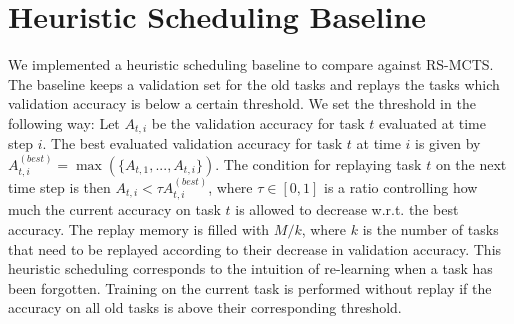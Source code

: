 
\section{Heuristic Scheduling Baseline}\label{paperC:app:heuristic_scheduling_baseline}

We implemented a heuristic scheduling baseline to compare against RS-MCTS. The baseline keeps a validation set for the old tasks and replays the tasks which validation accuracy is below a certain threshold. We set the threshold in the following way: Let $A_{t, i}$ be the validation accuracy for task $t$ evaluated at time step $i$. The best evaluated validation accuracy for task $t$ at time $i$ is given by $A_{t, i}^{(best)} = \max(\{A_{t, 1}, ..., A_{t, i} \})$. The condition for replaying task $t$ on the next time step is then $A_{t, i} < \tau A_{t, i}^{(best)}$, where $\tau \in [0, 1]$ is a ratio controlling how much the current accuracy on task $t$ is allowed to decrease w.r.t. the best accuracy. The replay memory is filled with $M/k$, where $k$ is the number of tasks that need to be replayed according to their decrease in validation accuracy. This heuristic scheduling corresponds to the intuition of re-learning when a task has been forgotten. Training on the current task is performed without replay if the accuracy on all old tasks is above their corresponding threshold.       

\vspace{-3mm}
